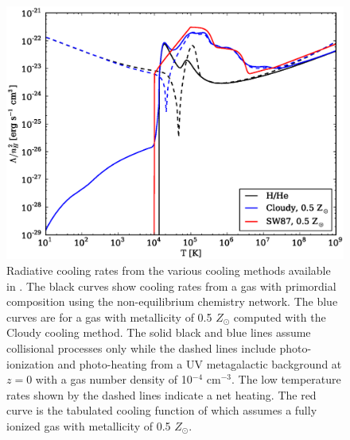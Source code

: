 \begin{figure}
  \begin{center}
    \includegraphics[width=1.0\textwidth]{figures/cooling_rate.eps}
  \end{center}
  \caption{Radiative cooling rates from the various cooling methods
    available in \enzo.  The black curves show cooling rates from a gas
    with primordial composition using the non-equilibrium chemistry
    network.  The blue curves are for a gas with metallicity of 0.5
    $Z_{\odot}$ computed with the Cloudy cooling method.  The solid
    black and blue lines assume collisional processes only while the
    dashed lines include photo-ionization and photo-heating from a UV
    metagalactic background at $z = 0$ with a gas number density of
    10$^{-4}$ cm$^{-3}$.  The low temperature rates shown by the
    dashed lines indicate a net heating.  The red curve is the
    tabulated cooling function of \citet{SW87} which assumes a fully
    ionized gas with metallicity of 0.5 $Z_{\odot}$.}
  \label{fig.cooling_rate}
\end{figure}
